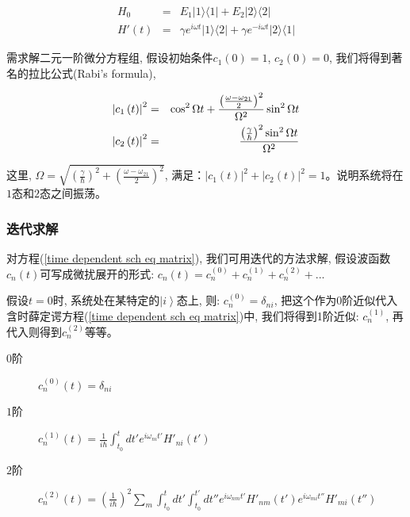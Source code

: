 
\begin{eqnarray*}
  H_0 &=& E_1 | 1 \rangle \langle 1| + E_2 | 2 \rangle \langle 2| \\
  H'(t) &=& \gamma e^{i \omega t} | 1 \rangle \langle 2 | + \gamma
e^{- i \omega t} | 2 \rangle \langle 1 |
\end{eqnarray*}

需求解二元一阶微分方程组, 假设初始条件$c_1(0) =1$, $c_2(0)=0$,
我们将得到著名的拉比公式(Rabi's formula),

\begin{eqnarray*}
  \left| {c_1 \left( t \right)} \right|^2 &=& \cos ^2 \Omega t +
\frac{{\left( {{\textstyle{{\omega  - \omega _{21} } \over 2}}}
\right)^2 }}{{\Omega ^2 }}\sin ^2 \Omega t \\
  \left| {c_2 \left( t
\right)} \right|^2 &=& \frac{{\left( {{\textstyle{\gamma  \over
\hbar }}} \right)^2 \sin ^2 \Omega t}}{{\Omega ^2 }}
\end{eqnarray*}


这里, $\Omega  = \sqrt {\left( {\frac{\gamma }{\hbar }} \right)^2  +
\left( {\frac{{\omega  - \omega _{21} }}{2}} \right)^2 } $,
满足：$\left| {c_1 \left( t \right)} \right|^2  + \left| {c_2 \left(
t \right)} \right|^2  = 1$。说明系统将在$1$态和$2$态之间振荡。



\subsubsection*{迭代求解}

对方程(\ref{time dependent sch eq matrix}), 我们可用迭代的方法求解,
假设波函数$c_n(t)$可写成微扰展开的形式: $c_n(t) = c_n^{(0)} +
c_n^{(1)} + c_n^{(2)} + ...$


假设$t=0$时, 系统处在某特定的$\left| i \right\rangle $态上, 则:
$c_n^{(0)} = \delta_{ni}$,
把这个作为0阶近似代入含时薛定谔方程(\ref{time dependent sch eq
matrix})中, 我们将得到1阶近似: $c_n^{(1)}$,
再代入则得到$c_n^{(2)}$等等。

\begin{description}
  \item[$0$阶] $c_n^{(0)} (t) = \delta_{ni}$
  \item[$1$阶] $c_n^{(1)}(t) = \frac{1}{i\hbar} \int_{t_0}^t dt' e^{i \omega_{ni}
t'}H'_{ni}(t')$
  \item[$2$阶] $c_n^{(2)}(t) = (\frac{1}{i\hbar})^2 \sum\limits_m \int_{t_0}^t dt'
\int_{t_0}^{t'} dt'' e^{i
\omega_{nm}t'}H'_{nm}(t')e^{i\omega_{mi}t''}H'_{mi}(t'')$
\end{description}


